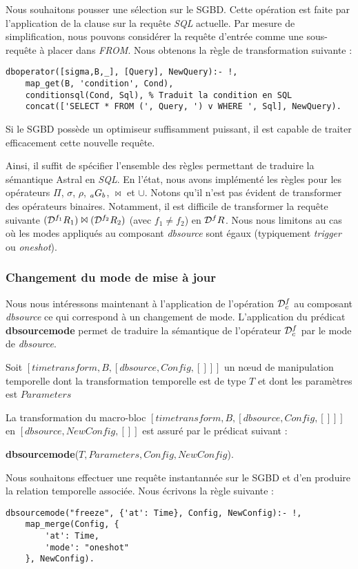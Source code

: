 \begin{example}
    Nous souhaitons pousser une sélection sur le SGBD. Cette opération est faite par l'application de la clause  sur la requête \textit{SQL} actuelle. Par mesure de simplification, nous pouvons considérer la requête d'entrée comme une sous-requête à placer dans \textit{FROM}. Nous obtenons la règle de transformation suivante :
    \begin{lstlisting}
dboperator([sigma,B,_], [Query], NewQuery):- !,
    map_get(B, 'condition', Cond),
    conditionsql(Cond, Sql), % Traduit la condition en SQL
    concat(['SELECT * FROM (', Query, ') v WHERE ', Sql], NewQuery).
    \end{lstlisting}

    Si le SGBD possède un optimiseur suffisamment puissant, il est capable de traiter efficacement cette nouvelle requête.
\end{example}

Ainsi, il suffit de spécifier l'ensemble des règles permettant de traduire la sémantique Astral en \textit{SQL}. En l'état, nous avons implémenté les règles pour les opérateurs $\Pi$, $\sigma$, $\rho$, $\null_a G_b$, $\Join$ et $\cup$. Notons qu'il n'est pas évident de transformer des opérateurs binaires. Notamment, il est difficile de transformer la requête suivante $(\mathcal{D}^{f_1} R_1)\Join (\mathcal{D}^{f_2} R_2)$ (avec $f_1\neq f_2$) en $\mathcal{D}^{f} R$. Nous nous limitons au cas où les modes appliqués au composant \textit{dbsource} sont égaux (typiquement \textit{trigger} ou \textit{oneshot}).

\subsubsection{Changement du mode de mise à jour}
Nous nous intéressons maintenant à l'application de l'opération $\mathcal{D}^f_c$ au composant \textit{dbsource} ce qui correspond à un changement de mode. L'application du prédicat \textbf{dbsourcemode} permet de traduire la sémantique de l'opérateur $\mathcal{D}^f_c$ par le mode de \textit{dbsource}.
\begin{regle}
    Soit $[timetransform,B,[dbsource, Config, []]]$ un nœud de manipulation temporelle dont la transformation temporelle est de type $T$ et dont les paramètres est $Parameters$

    La transformation du macro-bloc $[timetransform,B,[dbsource, Config, []]]$ en $[dbsource,NewConfig,[]]$ est assuré par le prédicat suivant :
    \begin{center} \textbf{dbsourcemode}($T, Parameters, Config, NewConfig$).\end{center}
\end{regle}
\begin{example}
    Nous souhaitons effectuer une requête instantannée sur le SGBD et d'en produire la relation temporelle associée. Nous écrivons la règle suivante :
    \begin{lstlisting}
dbsourcemode("freeze", {'at': Time}, Config, NewConfig):- !,
    map_merge(Config, {
        'at': Time,
        'mode': "oneshot"
    }, NewConfig).
    \end{lstlisting}
\end{example}

